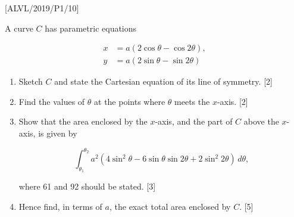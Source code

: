 \item {[}ALVL/2019/P1/10{]}

A curve $C$ has parametric equations 

\begin{align*}
x & =a\left(2\cos\theta-\cos2\theta\right),\\
y & =a\left(2\sin\theta-\sin2\theta\right)
\end{align*}

\begin{enumerate}
\item Sketch $C$ and state the Cartesian equation of its line of symmetry.
\hfill{}{[}2{]}
\item Find the values of $\theta$ at the points where $\theta$ meets the
$x$-axis.\hfill{} {[}2{]}
\item Show that the area enclosed by the $x$-axis, and the part of $C$
above the $x$-axis, is given by 

\[
\int_{\theta_{1}}^{\theta_{2}}a^{2}\left(4\sin^{2}\theta-6\sin\theta\sin2\theta+2\sin^{2}2\theta\right)\,d\theta,
\]

where 61 and 92 should be stated. \hfill{}{[}3{]}
\item Hence find, in terms of $a$, the exact total area enclosed by $C$.\hfill{}
{[}5{]}
\end{enumerate}
